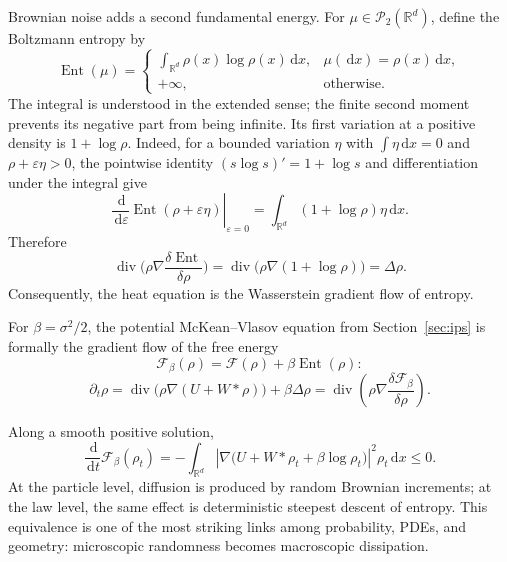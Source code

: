 \documentclass[11pt]{amsart}
\numberwithin{equation}{section}
\theoremstyle{plain}
\newcommand{\R}{\mathbb{R}}
\newcommand{\cP}{\mathcal{P}}
\newcommand{\dd}{\,\mathrm{d}}
\newcommand{\abs}[1]{\left\lvert#1\right\rvert}
\DeclareMathOperator{\diver}{div}
\begin{document}
Brownian noise adds a second fundamental energy.  For
$\mu\in\cP_2(\R^d)$, define the Boltzmann entropy by
\begin{equation}\label{eq:boltzmann-entropy}
 \operatorname{Ent}(\mu)
 =\begin{cases}
   \displaystyle\int_{\R^d}\rho(x)\log\rho(x)\dd x,
      &\mu(\dd x)=\rho(x)\dd x,\\
   +\infty,&\text{otherwise}.
  \end{cases}
\end{equation}
The integral is understood in the extended sense; the finite second moment
prevents its negative part from being infinite.  Its first variation at a
positive density is $1+\log\rho$.  Indeed, for a bounded variation
$\eta$ with $\int\eta\dd x=0$ and $\rho+\varepsilon\eta>0$, the pointwise
identity $(s\log s)'=1+\log s$ and differentiation under the integral give
\[
 \left.\frac{\dd}{\dd\varepsilon}
 \operatorname{Ent}(\rho+\varepsilon\eta)\right|_{\varepsilon=0}
 =\int_{\R^d}(1+\log\rho)\eta\dd x.
\]
Therefore
\[
 \diver\bigl(\rho\nabla \frac{\delta \operatorname{Ent}}{\delta\rho}\bigr)= \diver\bigl(\rho\nabla(1+\log\rho)\bigr)=\Delta\rho.
\]
Consequently, the heat equation is the Wasserstein gradient flow of entropy.

For $\beta=\sigma^2/2$, the potential McKean--Vlasov equation from Section~\ref{sec:ips} is formally the gradient flow of the free energy
\begin{equation}\label{eq:free-energy}
 \mathcal F_\beta(\rho)
 =\mathcal F(\rho)+\beta\operatorname{Ent}(\rho):
\end{equation}
\begin{equation}\label{eq:free-energy-gradient-flow}
 \partial_t\rho
 =\diver\bigl(\rho\nabla(U+W*\rho)\bigr)+\beta\Delta\rho
 =\diver\left(\rho\nabla
       \frac{\delta\mathcal F_\beta}{\delta\rho}\right).
\end{equation}

Along a smooth positive solution,
\begin{equation}\label{eq:free-energy-dissipation}
 \frac{\dd}{\dd t}\mathcal F_\beta(\rho_t)
 =-\int_{\R^d}
 \abs{\nabla\bigl(U+W*\rho_t+\beta\log\rho_t\bigr)}^2
 \rho_t\dd x\leq0.
\end{equation}
At the particle level, diffusion is produced by random Brownian increments;
at the law level, the same effect is deterministic steepest descent of
entropy.  This equivalence is one of the most striking links among
probability, PDEs, and geometry: microscopic randomness becomes macroscopic
dissipation.
\end{document}
